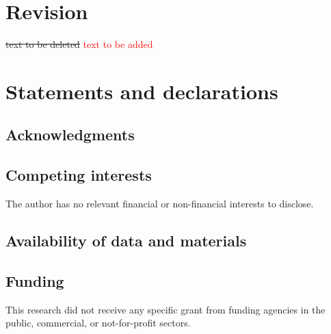 \documentclass[12 pt]{article}
\begin{document}
\section*{Revision}

\sout{text to be deleted} \textcolor{red}{text to be added}

\section*{Statements and declarations}

\subsection*{Acknowledgments}

\lipsum[11][1-3]

\subsection*{Competing interests}

The author has no relevant financial or non-financial interests to disclose.

\subsection*{Availability of data and materials}

\lipsum[11][4-6]

\subsection*{Funding}

This research did not receive any specific grant from funding agencies in the public, commercial, or not-for-profit sectors.

\end{document}

